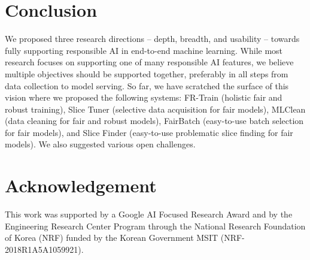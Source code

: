 \documentclass[11pt]{article}
\newcommand{\slicetuner}{Slice Tuner}
\newcommand{\frtrain}{FR-Train}
\newcommand{\fb}{FairBatch}
\newcommand{\mc}{MLClean}
\newcommand{\slicefinder}{Slice Finder}
\begin{document}







\section{Conclusion}

We proposed three research directions -- depth, breadth, and usability -- towards fully supporting responsible AI in end-to-end machine learning. While most research focuses on supporting one of many responsible AI features, we believe multiple objectives should be supported together, preferably in all steps from data collection to model serving. So far, we have scratched the surface of this vision where we proposed the following systems: \frtrain{} (holistic fair and robust training), \slicetuner{} (selective data acquisition for fair models), \mc{} (data cleaning for fair and robust models), \fb{} (easy-to-use batch selection for fair models), and \slicefinder{} (easy-to-use problematic slice finding for fair models). We also suggested various open challenges.


\section*{Acknowledgement}

This work was supported by a Google AI Focused Research Award and by the Engineering Research Center Program through the National Research Foundation of Korea (NRF) funded by the Korean Government MSIT (NRF-2018R1A5A1059921).


% 
% 
\end{document}
